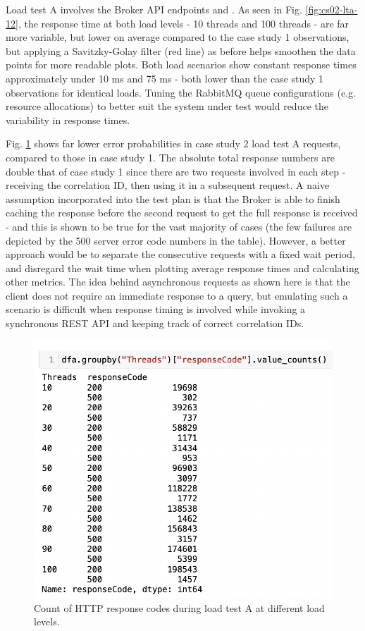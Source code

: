 Load test A involves the Broker API endpoints  and . As seen in Fig. \ref{fig:cs02-lta-12}, the response time at both load levels - 10 threads and 100 threads - are far more variable, but lower on average compared to the case study 1 observations, but applying a Savitzky-Golay filter (red line) as before helps smoothen the data points for more readable plots. Both load scenarios show constant response times approximately under 10 ms and 75 ms - both lower than the case study 1 observations for identical loads. Tuning the RabbitMQ queue configurations (e.g. resource allocations) to better suit the system under test would reduce the variability in response times.

Fig. \ref{fig:cs02-lta-3} shows far lower error probabilities in case study 2 load test A requests, compared to those in case study 1. The absolute total response numbers are double that of case study 1 since there are two requests involved in each step - receiving the correlation ID, then using it in a subsequent request. A naive assumption incorporated into the test plan is that the Broker is able to finish caching the response before the second request to get the full response is received - and this is shown to be true for the vast majority of cases (the few failures are depicted by the 500 server error code numbers in the table). However, a better approach would be to separate the consecutive requests with a fixed wait period, and disregard the wait time when plotting average response times and calculating other metrics. The idea behind asynchronous requests as shown here is that the client does not require an immediate response to a query, but emulating such a scenario is difficult when response timing is involved while invoking a synchronous REST API and keeping track of correct correlation IDs.

\begin{figure}[H]
  \centering
  \includegraphics[width=0.5\linewidth]{./assets/images/case-studies/cs02-lta-3.png}
  \caption{Count of HTTP response codes during load test A at different load levels.}
  \label{fig:cs02-lta-3}
\end{figure}

